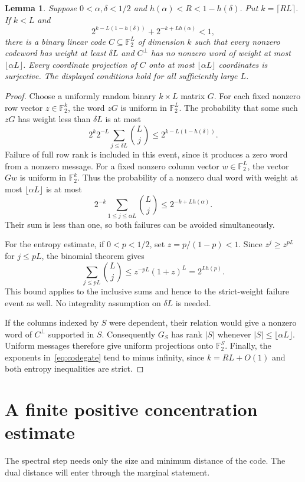 \documentclass[11pt]{article}
\newtheorem{lemma}[theorem]{Lemma}
\newcommand{\F}{\mathbb F}
\begin{document}
\begin{lemma}\label{lem:code}
Suppose $0<\alpha,\delta<1/2$ and
$h(\alpha)<R<1-h(\delta)$. Put $k=\lceil RL\rceil$.
If $k<L$ and
\begin{equation}\label{eq:codegate}
 2^{k-L(1-h(\delta))}+2^{-k+Lh(\alpha)}<1,
\end{equation}
there is a binary linear code $C\subseteq\F_2^L$ of dimension $k$
such that every nonzero codeword has weight at least $\delta L$ and
$C^\perp$ has no nonzero word of weight at most $\lfloor\alpha L\rfloor$.
Every coordinate projection of $C$ onto at most $\lfloor\alpha L\rfloor$
coordinates is surjective. The displayed conditions hold for all
sufficiently large $L$.
\end{lemma}
\begin{proof}
Choose a uniformly random binary $k\times L$ matrix $G$. For each fixed
nonzero row vector $z\in\F_2^k$, the word $zG$ is uniform in $\F_2^L$.
The probability that some such $zG$ has weight less than $\delta L$ is
at most
\[
 2^k2^{-L}\sum_{j\le\delta L}\binom Lj
       \le 2^{k-L(1-h(\delta))}.
\]
Failure of full row rank is included in this event, since it produces
a zero word from a nonzero message. For a fixed nonzero column vector
$w\in\F_2^L$, the vector $Gw$ is uniform in $\F_2^k$. Thus the probability
of a nonzero dual word with weight at most $\lfloor\alpha L\rfloor$ is
at most
\[
 2^{-k}\sum_{1\le j\le\alpha L}\binom Lj
       \le 2^{-k+Lh(\alpha)}.
\]
Their sum is less than one, so both failures can be avoided simultaneously.

For the entropy estimate, if $0<p<1/2$, set $z=p/(1-p)<1$. Since
$z^j\ge z^{pL}$ for $j\le pL$, the binomial theorem gives
\[
 \sum_{j\le pL}\binom Lj\le z^{-pL}(1+z)^L=2^{Lh(p)}.
\]
This bound applies to the inclusive sums and hence to the strict-weight
failure event as well. No integrality assumption on $\delta L$ is needed.

If the columns indexed by $S$ were dependent, their relation would give
a nonzero word of $C^\perp$ supported in $S$. Consequently $G_S$ has
rank $|S|$ whenever $|S|\le\lfloor\alpha L\rfloor$. Uniform messages
therefore give uniform projections onto $\F_2^S$. Finally, the exponents
in~\eqref{eq:codegate} tend to minus infinity, since $k=RL+O(1)$ and
both entropy inequalities are strict.
\end{proof}

\section{A finite positive concentration estimate}
The spectral step needs only the size and minimum distance of the code.
The dual distance will enter through the marginal statement.
\end{document}
